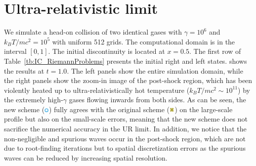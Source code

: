 \section{Ultra-relativistic limit}
\label{subsubsec:Ultra-relativistic limit}
We simulate a head-on collision of two identical gases with $\gamma=10^{6}$ and $k_{B}T/mc^2=10^5$ with uniform 512 grids. The computational domain is in the interval $[0,1]$. The initial discontinuity is located at $x=0.5$. The first row of Table~\ref{tb:IC_RiemannProblems} presents the initial right and left states.  shows the results at $t=1.0$. The left panels show the entire simulation domain, while the right panels show the zoom-in image of the post-shock region, which has been violently heated up to ultra-relativistically hot temperature ($k_{B}T/mc^2 \sim 10^{11}$) by the extremely high-$\gamma$ gases flowing inwards from both sides. As can be seen, the new scheme ($\tikz\draw[HeadOnCollisionNew,fill=white,line width=1] (0,0) circle (.5ex);$) fully agrees with the original scheme ($\MyCross[draw=HeadOnCollisionOri,fill=HeadOnCollisionOri]$) on the large-scale profile but also on the small-scale errors, meaning that the new scheme does not sacrifice the numerical accuracy in the UR limit. In addition, we notice that the non-negligible and spurious waves occur in the post-shock region, which are not due to root-finding iterations but to spatial discretization errors as the spurious waves can be reduced by increasing spatial resolution.


